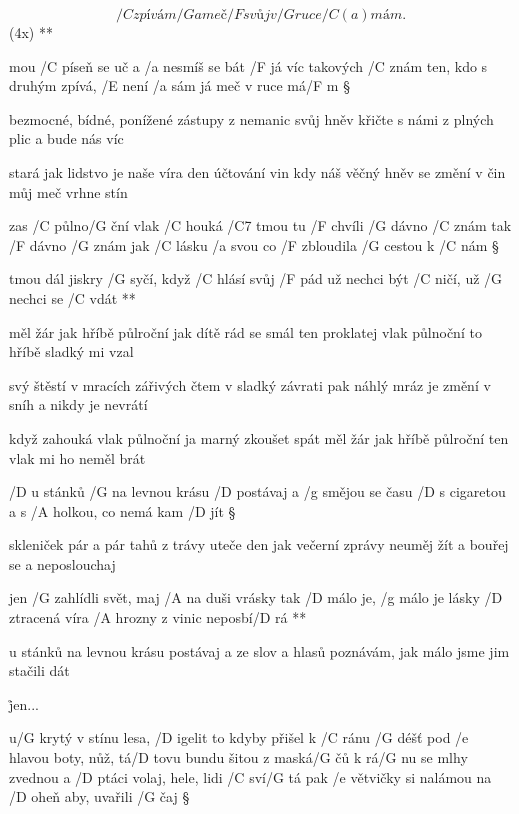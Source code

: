 
\R \[ /C zpívám /G a meč /F svůj v /G ruce /{C (a)} mám. \](4x) **

mou /C píseň se uč a /a nesmíš se bát
/F já víc takových /C znám
ten, kdo s druhým zpívá, /E není /a sám
já meč v ruce má/F m \S

bezmocné, bídné, ponížené
zástupy z nemanic
svůj hněv křičte s námi z plných plic
a bude nás víc \s

stará jak lidstvo je naše víra
den účtování vin
kdy náš věčný hněv se změní v čin
můj meč vrhne stín \s




zas /C půlno/G ční vlak /C houká /C7 tmou
tu /F chvíli /G dávno /C znám
tak /F dávno /G znám jak /C lásku /a svou
co /F zbloudila /G cestou k /C nám \S

\R tmou dál jiskry /G syčí, když /C hlásí svůj /F pád
   už nechci být /C ničí, už /G nechci se /C vdát **

měl žár jak hříbě půlroční
jak dítě rád se smál
ten proklatej vlak půlnoční
to hříbě sladký mi vzal \songgg

svý štěstí v mracích zářivých
čtem v sladký závrati
pak náhlý mráz je změní v sníh
a  nikdy je nevrátí \s

když zahouká vlak půlnoční
ja marný zkoušet spát
měl žár jak hříbě půlroční
ten vlak mi ho neměl brát \s




/D u stánků /G na levnou krásu
/D postávaj a /g smějou se času
/D s cigaretou a s /A holkou, co nemá kam /D jít \S

skleniček pár a pár tahů z trávy
uteče den jak večerní zprávy
neuměj žít a bouřej se a neposlouchaj \s

\R jen /G zahlídli svět, maj /A na duši vrásky
   tak /D málo je, /g málo je lásky
   /D ztracená víra /A hrozny z vinic neposbí/D rá **

u stánků na levnou  krásu
postávaj a ze slov a hlasů
poznávám, jak málo jsme jim stačili dát \s

\r jen...




u/G krytý v stínu lesa, /D igelit
to kdyby přišel k /C ránu /G déšť
pod /e hlavou boty, nůž, tá/D tovu bundu šitou z maská/G čů
k rá/G nu se mlhy zvednou
a /D ptáci volaj, hele, lidi /C sví/G tá
pak /e větvičky si nalámou na /D oheň aby, uvařili /G čaj \S

